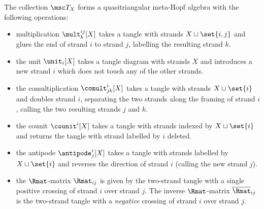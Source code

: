 \documentclass{article}
\begin{document}
\begin{theorem}
        \label{thm:vt_qtmha}
        The collection $\tangle_X$ forms a quasitriangular meta-Hopf algebra
        with the following operations:
        \begin{itemize}
                \item multiplication $\mult^{ij}_{k}[X]$ takes a tangle with
                        strands $X\sqcup\set{i,j}$ and glues the end of strand
                        $i$ to strand $j$, labelling the resulting strand $k$.
                \item the unit $\unit_{i}[X]$ takes a tangle diagram with
                        strands $X$ and introduces a new strand $i$ which does
                        not touch any of the other strands.
                \item the comultiplication $\comult^{i}_{jk}[X]$ takes a tangle
                        with strands $X\sqcup \set{i}$ and doubles strand $i$,
                        separating the two strands along the framing of strand
                        $i$, calling the two resulting strands $j$ and $k$.
                \item the counit $\counit^{i}[X]$ takes a tangle with strands
                        indexed by $X\sqcup \set{i}$ and returns the tangle with
                        strand labelled by $i$ deleted.
                \item the antipode $\antipode^{i}_{j}[X]$ takes a tangle with
                        strands labelled by $X \sqcup \set{i}$ and reverses the
                        direction of strand $i$ (calling the new strand $j$).
                \item the $\Rmat$-matrix $\Rmat_{ij}$ is given by the two-strand
                        tangle with a single positive crossing of strand $i$
                        over strand $j$. The inverse $\Rmat$-matrix
                        $\Rmati_{ij}$ is the two-strand tangle with a
                        \emph{negative} crossing of strand $i$ over strand $j$.
        \end{itemize}
\end{theorem}
\end{document}
